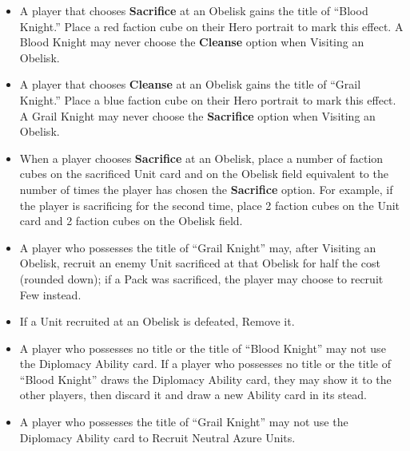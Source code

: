 \begin{multicols*}{2}
\begin{itemize}
\begin{enumerate}[leftmargin=15pt]
\begin{enumerate}
            \item *: Gain 18 , 9 , and 3 . Additionally, \textbf{Search (2)} the Relic card deck. Finally, if the Unit card was on the Pack side, \textbf{Search (2)} the  Unit deck; you may Recruit one of these Units for half the cost (rounded down).
        \end{enumerate}
    \end{enumerate}
    \item A player that chooses \textbf{Sacrifice} at an Obelisk gains the title of “\textcolor{darkcandyapplered}{Blood Knight}.” Place a red faction cube on their Hero portrait to mark this effect. A \textcolor{darkcandyapplered}{Blood Knight} may never choose the \textbf{Cleanse} option when Visiting an Obelisk.
    \item A player that chooses \textbf{Cleanse} at an Obelisk gains the title of “\textcolor{airforceblue}{Grail Knight}.” Place a blue faction cube on their Hero portrait to mark this effect. A \textcolor{airforceblue}{Grail Knight} may never choose the \textbf{Sacrifice} option when Visiting an Obelisk.
    \item When a player chooses \textbf{Sacrifice} at an Obelisk, place a number of faction cubes on the sacrificed Unit card and on the Obelisk field equivalent to the number of times the player has chosen the \textbf{Sacrifice} option. For example, if the player is sacrificing for the second time, place 2 faction cubes on the Unit card and 2 faction cubes on the Obelisk field.
    \item A player who possesses the title of “\textcolor{airforceblue}{Grail Knight}” may, after Visiting an Obelisk, recruit an enemy Unit sacrificed at that Obelisk for half the cost (rounded down); if a Pack was sacrificed, the player may choose to recruit Few instead.
    \item If a Unit recruited at an Obelisk is defeated, Remove it.
    \item A player who possesses no title or the title of “\textcolor{darkcandyapplered}{Blood Knight}” may not use the Diplomacy Ability card. If a player who possesses no title or the title of “\textcolor{darkcandyapplered}{Blood Knight}” draws the Diplomacy Ability card, they may show it to the other players, then discard it and draw a new Ability card in its stead.
    \item A player who possesses the title of “\textcolor{airforceblue}{Grail Knight}” may not use the Diplomacy Ability card to Recruit Neutral Azure Units.

\end{itemize}
\end{multicols*}

